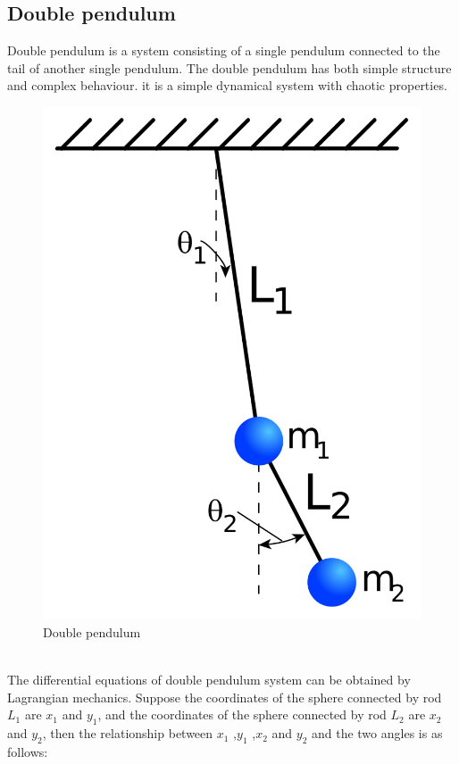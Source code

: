 \documentclass[11pt,a4paper]{article}
\begin{document}
\subsection{Double pendulum}
Double pendulum is a system consisting of a single pendulum connected to the tail of another single pendulum. The double pendulum has both simple structure and complex behaviour. it is a simple dynamical system with chaotic properties.
\\
\begin{figure}[h!]
\centering
\includegraphics[scale=0.15]{5.png}
\caption{Double pendulum}
\label{fig:Double pendulum}
\end{figure}
\\
The differential equations of double pendulum system can be obtained by Lagrangian mechanics. Suppose the coordinates of the sphere connected by rod $L_{1}$ are $x_{1}$ and $y_{1}$, and the coordinates of the sphere connected by rod $L_{2}$ are $x_{2}$ and $y_{2}$, then the relationship between $x_{1}$ ,$y_{1}$ ,$x_{2}$ and $y_{2}$ and the two angles is as follows:
\end{document}
